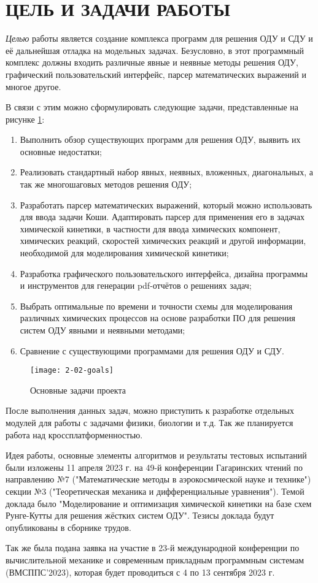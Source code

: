 \section{ЦЕЛЬ И ЗАДАЧИ РАБОТЫ} %

\textit{Целью} работы является создание комплекса программ для решения ОДУ и СДУ и её дальнейшая отладка на модельных задачах.
Безусловно, в этот программный комплекс должны входить различные явные и неявные методы решения ОДУ, графический
пользовательский интерфейс, парсер математических выражений и многое другое.

В связи с этим можно сформулировать следующие задачи, представленные на рисунке \ref{fig:goals}:
\begin{enumerate}
    \item Выполнить обзор существующих программ для решения ОДУ, выявить их основные недостатки;
    \item Реализовать стандартный набор явных, неявных, вложенных, диагональных, а так же многошаговых методов решения ОДУ;
    \item Разработать парсер математических выражений, который можно использовать для ввода задачи Коши. Адаптировать парсер для
    применения его в задачах химической кинетики, в частности для ввода химических компонент, химических реакций, скоростей
    химических реакций и другой информации, необходимой для моделирования химической кинетики;
    \item Разработка графического пользовательского интерфейса, дизайна программы и инструментов для генерации pdf-отчётов о решениях
    задач;
    \item Выбрать оптимальные по времени и точности схемы для моделирования различных химических процессов на основе разработки ПО
    для решения систем ОДУ явными и неявными методами;
    \item Сравнение с существующими программами для решения ОДУ и СДУ.
\end{enumerate}

\begin{figure}
    \texttt{[image: 2-02-goals]}
    \caption{Основные задачи проекта}
    \label{fig:goals}
\end{figure}

После выполнения данных задач, можно приступить к разработке отдельных модулей для работы с задачами физики, биологии и т.д. Так же
планируется работа над кроссплатформенностью.

Идея работы, основные элементы алгоритмов и результаты тестовых испытаний были изложены 11 апреля 2023 г. на 49-й конференции
Гагаринских чтений
по направлению №7 ("Математические методы в аэрокосмической науке и технике")
секции №3 ("Теоретическая механика и дифференциальные уравнения"). Темой доклада было "Моделирование и оптимизация химической кинетики
на базе схем Рунге-Кутты для решения жёстких систем ОДУ". Тезисы доклада будут опубликованы в сборнике трудов.

Так же была подана заявка на участие в 23-й международной конференции по вычислительной механике и современным прикладным
программным системам (ВМСППС'2023), которая будет проводиться с 4 по 13 сентября 2023 г. 